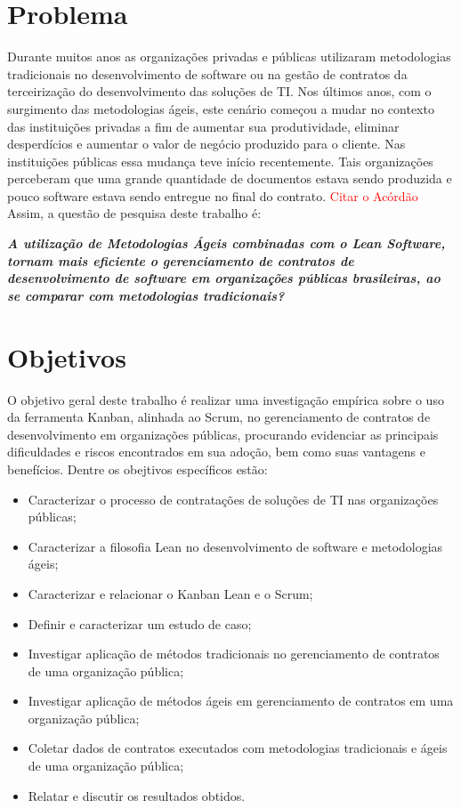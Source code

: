 \section[Problema]{Problema}

Durante muitos anos as organizações privadas e públicas utilizaram metodologias tradicionais no desenvolvimento de software ou na gestão de contratos da terceirização do desenvolvimento das soluções de TI. Nos últimos anos, com o surgimento das metodologias ágeis, este cenário começou a mudar no contexto das instituições privadas a fim de aumentar sua produtividade, eliminar desperdícios e aumentar o valor de negócio produzido para o cliente. Nas instituições públicas essa mudança teve início recentemente. Tais organizações perceberam que uma grande quantidade de documentos estava sendo produzida e pouco software estava sendo entregue no final do contrato. \textcolor{red}{Citar o Acórdão} Assim, a questão de pesquisa deste trabalho é:

\textit{\textbf {A utilização de Metodologias Ágeis combinadas com o Lean Software, tornam mais eficiente o gerenciamento de contratos de desenvolvimento de software em organizações públicas brasileiras, ao se comparar com metodologias tradicionais?}}

\section[Objetivos]{Objetivos}

O objetivo geral deste trabalho é realizar uma investigação empírica sobre o uso da ferramenta Kanban, alinhada ao Scrum, no gerenciamento de contratos de desenvolvimento em organizações públicas, procurando evidenciar as principais dificuldades e riscos encontrados em sua adoção, bem como suas vantagens e benefícios. Dentre os obejtivos específicos estão:

\begin{itemize}
\item Caracterizar o processo de contratações de soluções de TI nas organizações públicas;
\item Caracterizar a filosofia Lean no desenvolvimento de software e metodologias ágeis;
\item Caracterizar e relacionar o Kanban Lean e o Scrum;
\item Definir e caracterizar um estudo de caso;
\item Investigar aplicação de métodos tradicionais no gerenciamento de contratos de uma organização pública;
\item Investigar aplicação de métodos ágeis em gerenciamento de contratos em uma organização pública;
\item Coletar dados de contratos executados com metodologias tradicionais e ágeis de uma organização pública;
\item Relatar e discutir os resultados obtidos.
\end{itemize}

